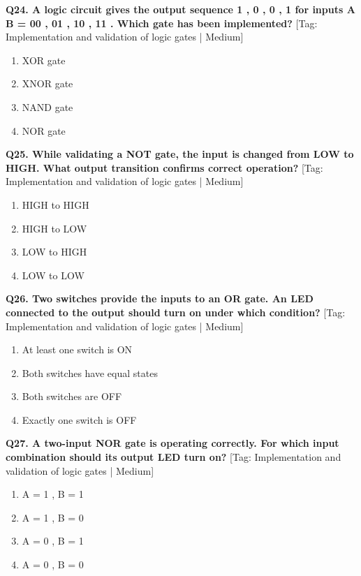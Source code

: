 \noindent\textbf{Q24. A logic circuit gives the output sequence 1 , 0 , 0 , 1 for inputs A B = 00 , 01 , 10 , 11 . Which gate has been implemented?} \hfill [Tag: Implementation and validation of logic gates | Medium]
\begin{enumerate}[label=(\alph*),topsep=2pt,itemsep=1pt,partopsep=0pt,parsep=0pt]
    \item {XOR gate}
    \item {XNOR gate}
    \item {NAND gate}
    \item {NOR gate}
\end{enumerate}
\vspace{2mm}

\noindent\textbf{Q25. While validating a NOT gate, the input is changed from LOW to HIGH. What output transition confirms correct operation?} \hfill [Tag: Implementation and validation of logic gates | Medium]
\begin{enumerate}[label=(\alph*),topsep=2pt,itemsep=1pt,partopsep=0pt,parsep=0pt]
    \item {HIGH to HIGH}
    \item {HIGH to LOW}
    \item {LOW to HIGH}
    \item {LOW to LOW}
\end{enumerate}
\vspace{2mm}

\noindent\textbf{Q26. Two switches provide the inputs to an OR gate. An LED connected to the output should turn on under which condition?} \hfill [Tag: Implementation and validation of logic gates | Medium]
\begin{enumerate}[label=(\alph*),topsep=2pt,itemsep=1pt,partopsep=0pt,parsep=0pt]
    \item {At least one switch is ON}
    \item {Both switches have equal states}
    \item {Both switches are OFF}
    \item {Exactly one switch is OFF}
\end{enumerate}
\vspace{2mm}

\noindent\textbf{Q27. A two-input NOR gate is operating correctly. For which input combination should its output LED turn on?} \hfill [Tag: Implementation and validation of logic gates | Medium]
\begin{enumerate}[label=(\alph*),topsep=2pt,itemsep=1pt,partopsep=0pt,parsep=0pt]
    \item {A = 1 , B = 1}
    \item {A = 1 , B = 0}
    \item {A = 0 , B = 1}
    \item {A = 0 , B = 0}
\end{enumerate}
\vspace{2mm}

